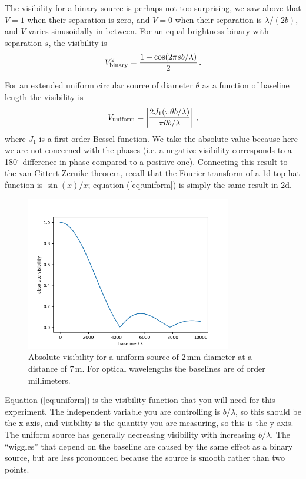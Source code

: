 \documentclass[11pt]{article}
\begin{document}
The visibility for a binary source is perhaps not too surprising, we saw above that $V=1$ when their separation is zero, and $V=0$ when their separation is $\lambda/(2b)$, and $V$ varies sinusoidally in between. For an equal brightness binary with separation $s$, the visibility is
\begin{equation}
    V^2_{\rm binary} = \frac{1 + \cos ( 2 \pi s b / \lambda )}{2} \, .
\end{equation}

For an extended uniform circular source of diameter $\theta$ as a function of baseline length the visibility is
\begin{equation}\label{eq:uniform}
    V_{\rm uniform} =  \left\vert \frac{2 J_1(\pi \theta b / \lambda)}{\pi \theta b / \lambda} \right\vert \, ,
\end{equation}
where $J_1$ is a first order Bessel function. We take the absolute value because here we are not concerned with the phases (i.e. a negative visibility corresponds to a 180$^\circ$ difference in phase compared to a positive one). Connecting this result to the van Cittert-Zernike theorem, recall that the Fourier transform of a 1d top hat function is $\sin(x)/x$; equation (\ref{eq:uniform}) is simply the same result in 2d.

\begin{figure}
    \centering
    \includegraphics[width=0.8\textwidth]{doc/uniform_vis.png}
    \caption{Absolute visibility for a uniform source of 2\,mm diameter at a distance of 7\,m. For optical wavelengths the baselines are of order millimeters.}
    \label{fig:uniformvis}
\end{figure}

Equation (\ref{eq:uniform}) is the visibility function that you will need for this experiment. The independent variable you are controlling is $b/\lambda$, so this should be the x-axis, and visibility is the quantity you are measuring, so this is the y-axis. The uniform source has generally decreasing visibility with increasing $b/\lambda$. The ``wiggles'' that depend on the baseline are caused by the same effect as a binary source, but are less pronounced because the source is smooth rather than two points.
\end{document}
